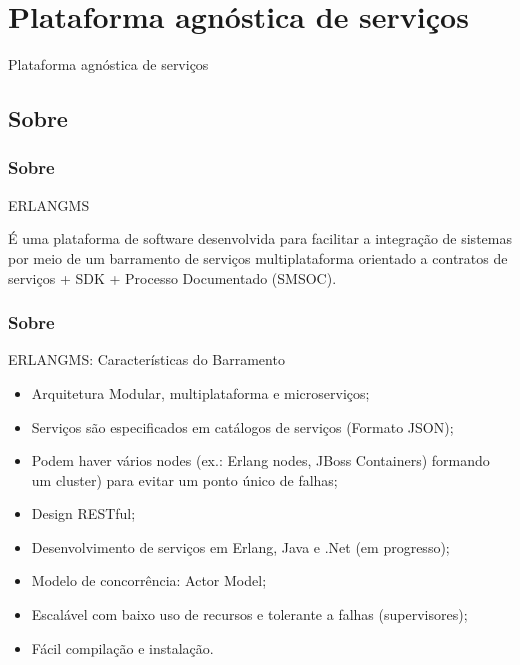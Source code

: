 \documentclass{beamer}
\begin{document}


\section{Plataforma agnóstica de serviços}


\begin{frame}[c]{ }
\centering
  \huge{Plataforma agnóstica de serviços}
\end{frame}



\subsection{Sobre}


\begin{frame}
  \frametitle{Sobre}

  \begin{exampleblock}{ERLANGMS}
  
É uma plataforma de software desenvolvida para facilitar a integração de sistemas por meio de um barramento 
de serviços multiplataforma orientado a contratos de serviços + SDK + Processo Documentado (SMSOC).

  \end{exampleblock}

  
\end{frame}


\begin{frame}
  \frametitle{Sobre}

  \begin{exampleblock}{ERLANGMS: Características do Barramento}
  
	  \begin{itemize}
		\item<1->Arquitetura Modular, multiplataforma e microserviços;
	    \item<1->Serviços são especificados em catálogos de serviços (Formato JSON);
	    \item<1->Podem haver vários nodes (ex.: Erlang nodes, JBoss Containers) formando um cluster)
	    			para evitar um ponto único de falhas;
    	    \item<1->Design RESTful;
    	    \item<1->Desenvolvimento de serviços em Erlang, Java e .Net (em progresso);
   	    \item<1->Modelo de concorrência: Actor Model;
    	    \item<1->Escalável com baixo uso de recursos e tolerante a falhas (supervisores);
    	    \item<1->Fácil compilação e instalação.
	  \end{itemize}

  \end{exampleblock}

  
\end{frame}
\end{document}
